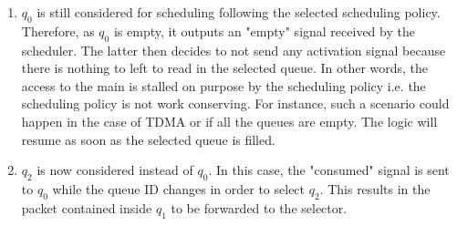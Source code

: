     \begin{enumerate}
        \item $q_{0}$ is still considered for scheduling following the selected scheduling policy. Therefore, as $q_{0}$ is empty, it outputs an "empty" signal received by the scheduler.
              The latter then decides to not send any activation signal because there is nothing to left to read in the selected queue.
              In other words, the access to the main is stalled on purpose by the scheduling policy i.e. the scheduling policy is not work conserving.
              For instance, such a scenario could happen in the case of TDMA or if all the queues are empty.
              The logic will resume as soon as the selected queue is filled.
        \item $q_{2}$ is now considered instead of $q_{0}$.
              In this case, the "consumed" signal is sent to $q_{0}$ while the queue ID changes in order to select $q_{2}$.
              This results in the packet contained inside $q_{1}$ to be forwarded to the selector.
    \end{enumerate}
